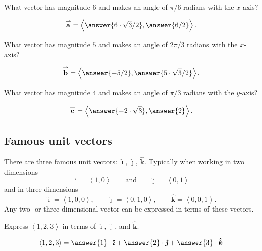 \documentclass{ximera}
\begin{document}
\begin{question}
  What vector has magnitude $6$ and makes an angle of $\pi/6$ radians with the $x$-axis?
  \begin{prompt}
    \[
    \overset{\rightharpoonup}{\mathbf{a}} = \left\langle \answer{6\cdot \sqrt{3}/2},\answer{6/2} \right\rangle.
    \]
  \end{prompt}
  \begin{question}
  What vector has magnitude $5$ and makes an angle of $2\pi/3$ radians with the $x$-axis?
  \begin{prompt}
    \[
    \overset{\rightharpoonup}{\mathbf{b}} = \left\langle \answer{-5/2},\answer{5\cdot \sqrt{3}/2} \right\rangle.
    \]
  \end{prompt}
  \begin{question}
  What vector has magnitude $4$ and makes an angle of $\pi/3$ radians with the $y$-axis?
  \begin{prompt}
    \[
    \overset{\rightharpoonup}{\mathbf{c}} = \left\langle \answer{-2\cdot \sqrt{3}},\answer{2} \right\rangle.
    \]
  \end{prompt}
  \end{question}
\end{question}
\end{question}



\subsection{Famous unit vectors}

There are three famous unit vectors: $\boldsymbol{\hat{\imath}}$, $\boldsymbol{\hat{\jmath}}$,
$\boldsymbol{\hat{k}}$. Typically when working in two dimensions
\[
\boldsymbol{\hat{\imath}}=\left\langle 1,0 \right\rangle \qquad\text{and}\qquad\boldsymbol{\hat{\jmath}}=\left\langle 0,1 \right\rangle
\]
and in three dimensions
\[
\boldsymbol{\hat{\imath}}=\left\langle 1,0,0 \right\rangle,\qquad \boldsymbol{\hat{\jmath}}=\left\langle 0,1,0 \right\rangle, \qquad\boldsymbol{\hat{k}}=\left\langle 0,0,1 \right\rangle.
\]
Any two- or three-dimensional vector can be expressed in terms of these
vectors.

\begin{question}
  Express $\left\langle 1,2,3 \right\rangle$ in terms of $\boldsymbol{\hat{\imath}}$, $\boldsymbol{\hat{\jmath}}$, and $\boldsymbol{\hat{k}}$.
  \begin{prompt}
    \[
    \left\langle 1,2,3 \right\rangle = \answer{1}\cdot\boldsymbol{\hat{\imath}} + \answer{2}\cdot\boldsymbol{\hat{\jmath}} + \answer{3}\cdot\boldsymbol{\hat{k}}
    \]
  \end{prompt}
\end{question}
\end{document}
